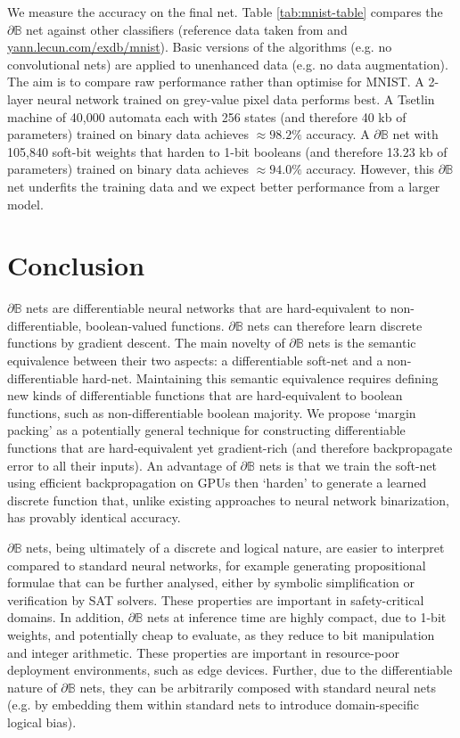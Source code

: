 \documentclass{article} %
\begin{document}
We measure the accuracy on the final net. Table \ref{tab:mnist-table} compares the $\partial\mathbb{B}$ net against other classifiers (reference data taken from \cite{granmo18} and \url{yann.lecun.com/exdb/mnist}). Basic versions of the algorithms (e.g. no convolutional nets) are applied to unenhanced data (e.g. no data augmentation). The aim is to compare raw performance rather than optimise for MNIST. A 2-layer neural network trained on grey-value pixel data performs best. A Tsetlin machine of 40,000 automata each with 256 states (and therefore 40 kb of parameters) trained on binary data achieves $\approx 98.2\%$ accuracy. A $\partial\mathbb{B}$ net with 105,840 soft-bit weights that harden to 1-bit booleans (and therefore 13.23 kb of parameters) trained on binary data achieves $\approx 94.0\%$ accuracy. However, this $\partial\mathbb{B}$ net underfits the training data and we expect better performance from a larger model.

\section{Conclusion}\label{sec:conclusion}

$\partial\mathbb{B}$ nets are differentiable neural networks that are hard-equivalent to non-differentiable, boolean-valued functions. $\partial\mathbb{B}$ nets can therefore learn discrete functions by gradient descent. The main novelty of $\partial\mathbb{B}$ nets is the semantic equivalence between their two aspects: a differentiable soft-net and a non-differentiable hard-net. Maintaining this semantic equivalence requires defining new kinds of differentiable functions that are hard-equivalent to boolean functions, such as non-differentiable boolean majority. We propose `margin packing' as a potentially general technique for constructing differentiable functions that are hard-equivalent yet gradient-rich (and therefore backpropagate error to all their inputs). An advantage of $\partial\mathbb{B}$ nets is that we train the soft-net using efficient backpropagation on GPUs then `harden' to generate a learned discrete function that, unlike existing approaches to neural network binarization, has provably identical accuracy.

$\partial\mathbb{B}$ nets, being ultimately of a discrete and logical nature, are easier to interpret compared to standard neural networks, for example generating propositional formulae that can be further analysed, either by symbolic simplification or verification by SAT solvers. These properties are important in safety-critical domains. In addition, $\partial\mathbb{B}$ nets at inference time are highly compact, due to 1-bit weights, and potentially cheap to evaluate, as they reduce to bit manipulation and integer arithmetic. These properties are important in resource-poor deployment environments, such as edge devices. Further, due to the differentiable nature of $\partial\mathbb{B}$ nets, they can be arbitrarily composed with standard neural nets (e.g. by embedding them within standard nets to introduce domain-specific logical bias).
\end{document}
